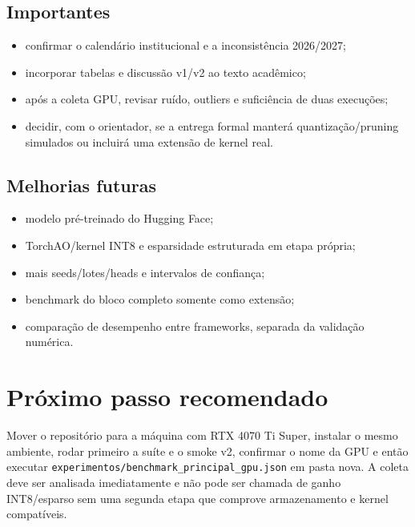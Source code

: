 \subsection{Importantes}


\begin{itemize}
\item confirmar o calendário institucional e a inconsistência 2026/2027;
\item incorporar tabelas e discussão v1/v2 ao texto acadêmico;
\item após a coleta GPU, revisar ruído, outliers e suficiência de duas execuções;
\item decidir, com o orientador, se a entrega formal manterá quantização/pruning
simulados ou incluirá uma extensão de kernel real.
\end{itemize}


\subsection{Melhorias futuras}


\begin{itemize}
\item modelo pré-treinado do Hugging Face;
\item TorchAO/kernel INT8 e esparsidade estruturada em etapa própria;
\item mais seeds/lotes/heads e intervalos de confiança;
\item benchmark do bloco completo somente como extensão;
\item comparação de desempenho entre frameworks, separada da validação numérica.
\end{itemize}


\section{Próximo passo recomendado}







Mover o repositório para a máquina com RTX 4070 Ti Super, instalar o mesmo ambiente, rodar primeiro a suíte e o smoke v2, confirmar o nome da GPU e então executar \texttt{experimentos/\allowbreak{}benchmark\_\allowbreak{}principal\_\allowbreak{}gpu.\allowbreak{}json} em pasta nova. A coleta deve ser analisada imediatamente e não pode ser chamada de ganho INT8/esparso sem uma segunda etapa que comprove armazenamento e kernel compatíveis.
